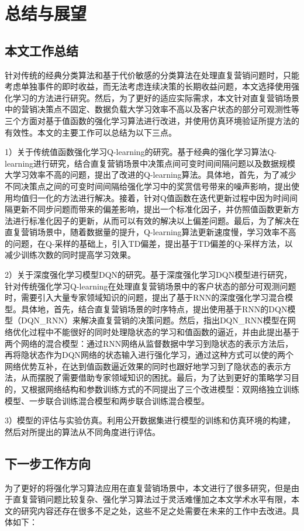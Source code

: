 \chapter{总结与展望}

\section{本文工作总结}
针对传统的经典分类算法和基于代价敏感的分类算法在处理直复营销问题时，只能考虑单独事件的即时收益，而无法考虑连续决策的长期收益问题，本文选择使用强化学习的方法进行研究。然后，为了更好的适应实际需求，本文针对直复营销场景中的营销决策点不固定、数据负载大学习效率不高以及客户状态的部分可观测性等三个方面对基于值函数的强化学习算法进行改进，并使用仿真环境验证所提方法的有效性。本文的主要工作可以总结为以下三点。

1）关于传统值函数强化学习Q-learning的研究。基于经典的强化学习算法Q-learning进行研究，结合直复营销场景中决策点间可变时间间隔问题以及数据规模大学习效率不高的问题，提出了改进的Q-learning算法。具体地，首先，为了减少不同决策点之间的可变时间间隔给强化学习中的奖赏信号带来的噪声影响，提出使用均值归一化的方法进行解决。接着，针对Q值函数在迭代更新过程中因为时间间隔更新不同步问题而带来的偏差影响，提出一个标准化因子，并仿照值函数更新方法进行标准化因子的更新，从而可以有效的解决以上偏差问题。最后，为了解决在直复营销场景中，随着数据量的提升，Q-learning算法更新速度慢，学习效率不高的问题，在Q-采样的基础上，引入TD偏差，提出基于TD偏差的Q-采样方法，以减少训练次数的同时提高学习效果。

2）关于深度强化学习模型DQN的研究。基于深度强化学习DQN模型进行研究，针对传统强化学习Q-learning在处理直复营销场景中的客户状态的部分可观测问题时，需要引入大量专家领域知识的问题，提出了基于RNN的深度强化学习混合模型。具体地，首先，结合直复营销场景的时序特点，提出使用基于RNN的DQN模型（DQN_RNN）来解决直复营销的决策问题。然后，指出DQN_RNN模型在网络优化过程中不能很好的同时处理隐状态的学习和值函数的逼近，并由此提出基于两个网络的混合模型：通过RNN网络从监督数据中学习到隐状态的表示方法后，再将隐状态作为DQN网络的状态输入进行强化学习，通过这种方式可以使的两个网络优势互补，在达到值函数逼近效果的同时也跟好地学习到了隐状态的表示方法，从而摆脱了需要借助专家领域知识的困扰。最后，为了达到更好的策略学习目的，又根据网络结构和参数训练方式的不同提出了三个改进模型：双网络独立训练模型、一步联合训练混合模型和两步联合训练混合模型。

3）模型的评估与实验仿真。利用公开数据集进行模型的训练和仿真环境的构建，然后对所提出的算法从不同角度进行评估。

\section{下一步工作方向}
 为了更好的将强化学习算法应用在直复营销场景中，本文进行了很多研究，但是由于直复营销问题比较复杂、强化学习算法过于灵活难懂加之本文学术水平有限，本文的研究内容还存在很多不足之处，这些不足之处需要在未来的工作中去改进。具体如下：

